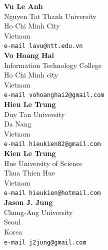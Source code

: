 \documentclass[10pt,leqno,twoside]{article}
\begin{document}
\vspace{2cm}

\noindent\textbf{Vu Le Anh}\\
Nguyen Tat Thanh University\\
Ho Chi Minh City\\
Vietnam\\
{\tt e-mail lavu@ntt.edu.vn}\\

\noindent\textbf{Vo Hoang Hai}\\
Information Technology College\\
Ho Chi Minh city\\
Vietnam\\
{\tt e-mail vohoanghai2@gmail.com}\\

\noindent\textbf{Hieu Le Trung}\\
Duy Tan University\\
Da Nang\\
Vietnam\\
{\tt e-mail hieukien82@gmail.com}\\

\noindent\textbf{Kien Le Trung}\\
Hue University of Science\\
Thua Thien Hue\\
Vietnam\\
{\tt e-mail hieukien@hotmail.com}\\

\noindent\textbf{Jason J. Jung}\\
Chung-Ang University\\
Seoul\\
Korea\\
{\tt e-mail j2jung@gmail.com }
\end{document}
